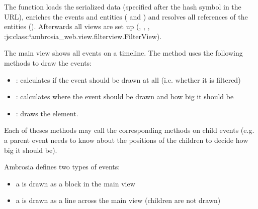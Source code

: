 \documentclass[letterpaper,10pt,english]{sphinxmanual}
\begin{document}
The function {\hyperref[ambrosia_web:ambrosia_web.init]{}} loads the serialized data (specified after the hash symbol in the URL),
enriches the events and entities ({\hyperref[ambrosia_web.entity:ambrosia_web.entity.enrich]{}} and {\hyperref[ambrosia_web.event:ambrosia_web.event.enrich]{}}) and
resolves all references of the entities (). Afterwards all views
are set up ({\hyperref[ambrosia_web.view.mainview.MainView:ambrosia_web.view.mainview.MainView]{}}, {\hyperref[ambrosia_web.view.entityview.EntityView:ambrosia_web.view.entityview.EntityView]{}},
{\hyperref[ambrosia_web.view.detailsview.DetailsView:ambrosia_web.view.detailsview.DetailsView]{}}, :js:class:{\color{red}\bfseries{}{}`}ambrosia\_web.view.filterview.FilterView).

The main view shows all events on a timeline. The method {\hyperref[ambrosia_web.view.mainview.MainView:ambrosia_web.view.mainview.MainView.redraw]{}} uses the
following methods to draw the events:
\begin{itemize}
\item {} 
{\hyperref[ambrosia_web.event.Event:ambrosia_web.event.Event.calcVisible]{}}: calculates if the event should be drawn at all (i.e. whether it is
filtered)

\item {} 
{\hyperref[ambrosia_web.event.Event:ambrosia_web.event.Event.calcDimensions]{}}: calculates where the event should be drawn and how big it should
be

\item {} 
{\hyperref[ambrosia_web.event.Event:ambrosia_web.event.Event.draw]{}}: draws the element.

\end{itemize}

Each of theses methods may call the corresponding methods on child events (e.g. a parent event needs to know about the
positions of the children to decide how big it should be).

Ambrosia defines two types of events:
\begin{itemize}
\item {} 
a {\hyperref[ambrosia_web.event.BlockEvent:ambrosia_web.event.BlockEvent]{}} is drawn as a block in the main view

\item {} 
a {\hyperref[ambrosia_web.event.LineEvent:ambrosia_web.event.LineEvent]{}} is drawn as a line across the main view (children are not drawn)

\end{itemize}
\end{document}
